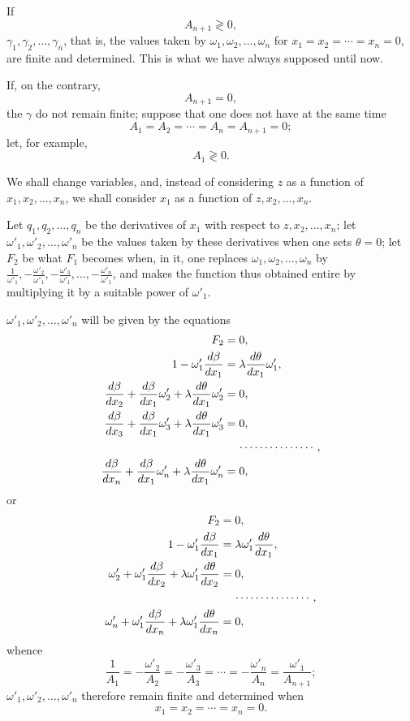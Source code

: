 \documentclass[11pt]{article}
\begin{document}
If
\[
A_{n+1}\gtrless0,
\]
$\gamma_1,\gamma_2,\ldots,\gamma_n$, that is, the values taken by $\omega_1,\omega_2,\ldots,\omega_n$ for $x_1=x_2=\cdots=x_n=0$, are finite and determined. This is what we have always supposed until now.

If, on the contrary,
\[
A_{n+1}=0,
\]
the $\gamma$ do not remain finite; suppose that one does not have at the same time
\[
A_1=A_2=\cdots=A_n=A_{n+1}=0;
\]
let, for example,
\[
A_1\gtrless0.
\]

We shall change variables, and, instead of considering $z$ as a function of $x_1,x_2,\ldots,x_n$, we shall consider $x_1$ as a function of $z,x_2,\ldots,x_n$.

Let $q_1,q_2,\ldots,q_n$ be the derivatives of $x_1$ with respect to $z,x_2,\ldots,x_n$; let $\omega'_1,\omega'_2,\ldots,\omega'_n$ be the values taken by these derivatives when one sets $\theta=0$; let $F_2$ be what $F_1$ becomes when, in it, one replaces $\omega_1,\omega_2,\ldots,\omega_n$ by $\frac{1}{\omega'_1},-\frac{\omega'_2}{\omega'_1},-\frac{\omega'_3}{\omega'_1},\ldots,-\frac{\omega'_n}{\omega'_1}$, and makes the function thus obtained entire by multiplying it by a suitable power of $\omega'_1$.

$\omega'_1,\omega'_2,\ldots,\omega'_n$ will be given by the equations
\[
\begin{aligned}
F_2&=0,\\
1-\omega'_1\frac{d\beta}{dx_1}&=\lambda\frac{d\theta}{dx_1}\omega'_1,\\
\frac{d\beta}{dx_2}+\frac{d\beta}{dx_1}\omega'_2+\lambda\frac{d\theta}{dx_1}\omega'_2&=0,\\
\frac{d\beta}{dx_3}+\frac{d\beta}{dx_1}\omega'_3+\lambda\frac{d\theta}{dx_1}\omega'_3&=0,\\
&\hspace{1.2em}\cdots\cdots\cdots\cdots\cdots,\\
\frac{d\beta}{dx_n}+\frac{d\beta}{dx_1}\omega'_n+\lambda\frac{d\theta}{dx_1}\omega'_n&=0,
\end{aligned}
\]
or
\[
\begin{aligned}
F_2&=0,\\
1-\omega'_1\frac{d\beta}{dx_1}&=\lambda\omega'_1\frac{d\theta}{dx_1},\\
\omega'_2+\omega'_1\frac{d\beta}{dx_2}+\lambda\omega'_1\frac{d\theta}{dx_2}&=0,\\
&\hspace{1.2em}\cdots\cdots\cdots\cdots\cdots,\\
\omega'_n+\omega'_1\frac{d\beta}{dx_n}+\lambda\omega'_1\frac{d\theta}{dx_n}&=0,
\end{aligned}
\]
whence
\[
\frac{1}{A_1}
=
-\frac{\omega'_2}{A_2}
=
-\frac{\omega'_3}{A_3}
=\cdots=
-\frac{\omega'_n}{A_n}
=
\frac{\omega'_1}{A_{n+1}};
\]
$\omega'_1,\omega'_2,\ldots,\omega'_n$ therefore remain finite and determined when
\[
x_1=x_2=\cdots=x_n=0.
\]
\end{document}
